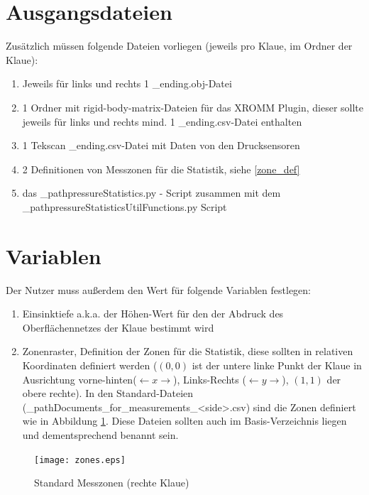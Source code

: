\documentclass[a4paper, openany, oneside]{memoir}
\begin{document}
\section{Ausgangsdateien}
Zusätzlich müssen folgende Dateien vorliegen (jeweils pro Klaue, im Ordner der Klaue):
\begin{enumerate}
\item Jeweils für links und rechts 1 \file_ending{.obj}-Datei 
\item 1 Ordner mit rigid-body-matrix-Dateien für das XROMM Plugin, dieser sollte jeweils für links und rechts mind. 1 \file_ending{.csv}-Datei enthalten
\item 1 Tekscan \file_ending{.csv}-Datei mit Daten von den Drucksensoren 
\item 2 Definitionen von Messzonen für die Statistik, siehe \ref{zone_def}
\item das \File_path{pressureStatistics.py} - Script zusammen mit dem\\ \File_path{pressureStatisticsUtilFunctions.py} Script
\end{enumerate}

\section{Variablen}
Der Nutzer muss außerdem den Wert für folgende Variablen festlegen:
\begin{enumerate}
\item Einsinktiefe a.k.a. der Höhen-Wert für den der Abdruck des Oberflächennetzes der Klaue bestimmt wird \label{th_def}
\item Zonenraster, Definition der Zonen für die Statistik, diese sollten in relativen Koordinaten definiert werden (\((0,0)\) ist der untere linke Punkt der Klaue in Ausrichtung vorne-hinten(\(\leftarrow x\rightarrow\)), Links-Rechts (\(\leftarrow y\rightarrow\)), \((1,1)\) der obere rechte). In den Standard-Dateien (\File_path{Documents\ProKlaue\testdaten\druck\segments_for_measurements_<side>.csv}) sind die Zonen definiert wie in Abbildung \ref{img_zones}. \label{zone_def} Diese Dateien sollten auch im Basis-Verzeichnis liegen und dementsprechend benannt sein.
\end{enumerate}


\begin{figure}
\begin{center}
\texttt{[image: zones.eps]}
\end{center}
\caption{Standard Messzonen (rechte Klaue)}
\label{img_zones}
\end{figure}
\end{document}
